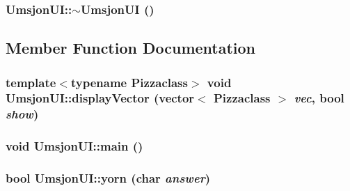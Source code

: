 \hypertarget{class_umsjon_u_i_afbb13b128eef1970fc6e090ff07635e}{
\subsubsection[$\sim$UmsjonUI]{\setlength{\rightskip}{0pt plus 5cm}Umsjon\-UI::$\sim$Umsjon\-UI ()}}
\label{class_umsjon_u_i_afbb13b128eef1970fc6e090ff07635e}




\subsection{Member Function Documentation}
\hypertarget{class_umsjon_u_i_f5fa5a8e9efaecd233787825f22c4e76}{
\subsubsection[displayVector]{\setlength{\rightskip}{0pt plus 5cm}template$<$typename Pizzaclass$>$ void Umsjon\-UI::display\-Vector (vector$<$ Pizzaclass $>$ {\em vec}, bool {\em show})}}
\label{class_umsjon_u_i_f5fa5a8e9efaecd233787825f22c4e76}


\hypertarget{class_umsjon_u_i_ea83b916b3f52eec32ae6d54d59b4453}{
\subsubsection[main]{\setlength{\rightskip}{0pt plus 5cm}void Umsjon\-UI::main ()}}
\label{class_umsjon_u_i_ea83b916b3f52eec32ae6d54d59b4453}


\hypertarget{class_umsjon_u_i_e1489f835e125c37fb30e595797d971d}{
\subsubsection[yorn]{\setlength{\rightskip}{0pt plus 5cm}bool Umsjon\-UI::yorn (char {\em answer})}}
\label{class_umsjon_u_i_e1489f835e125c37fb30e595797d971d}




